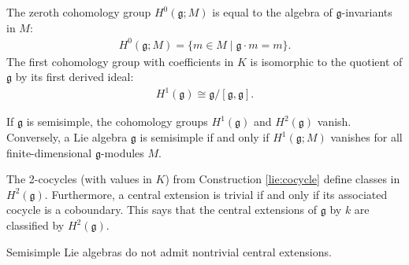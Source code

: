     \begin{property}[$H^0$ and $H^1$]
        The zeroth cohomology group $H^0(\mathfrak{g};M)$ is equal to the algebra of $\mathfrak{g}$-invariants in $M$:
        \begin{gather}
            \label{lie:zeroth_cohomology}
            H^0(\mathfrak{g};M) = \{m\in M\mid\mathfrak{g}\cdot m = m\}.
        \end{gather}
        The first cohomology group with coefficients in $K$ is isomorphic to the quotient of $\mathfrak{g}$ by its first derived ideal:
        \begin{gather}
            H^1(\mathfrak{g})\cong\mathfrak{g}/[\mathfrak{g},\mathfrak{g}].
        \end{gather}
    \end{property}

    \begin{property}
        If $\mathfrak{g}$ is semisimple, the cohomology groups $H^1(\mathfrak{g})$ and $H^2(\mathfrak{g})$ vanish. Conversely, a Lie algebra $\mathfrak{g}$ is semisimple if and only if $H^1(\mathfrak{g};M)$ vanishes for all finite-dimensional $\mathfrak{g}$-modules $M$.
    \end{property}

    \begin{property}
        The 2-cocycles (with values in $K$) from Construction \ref{lie:cocycle} define classes in $H^2(\mathfrak{g})$. Furthermore, a central extension is trivial if and only if its associated cocycle is a coboundary. This says that the central extensions of $\mathfrak{g}$ by $k$ are classified by $H^2(\mathfrak{g})$.
    \end{property}
    \begin{result}
        Semisimple Lie algebras do not admit nontrivial central extensions.
    \end{result}


